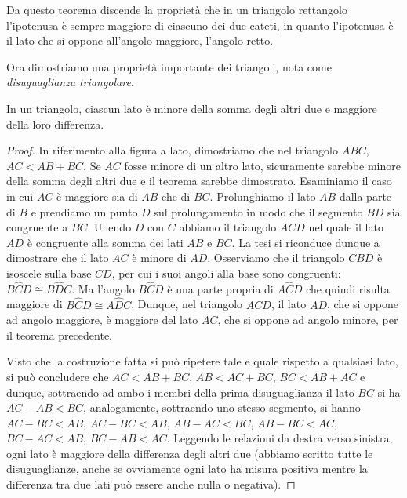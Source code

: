 Da questo teorema discende la proprietà che in un triangolo 
rettangolo l'ipotenusa è sempre maggiore di ciascuno dei due cateti, 
in quanto l'ipotenusa è il lato che si oppone all'angolo maggiore, 
l'angolo retto.

Ora dimostriamo una proprietà importante dei triangoli, nota come 
\emph{disuguaglianza triangolare}.

\begin{teorema}
In un triangolo, ciascun lato è minore della somma degli altri due e 
maggiore della loro differenza.
\end{teorema}

\noindent\begin{minipage}{0.7\textwidth}\parindent15pt 
\begin{proof}
In riferimento alla figura a lato, dimostriamo che nel triangolo 
\(ABC\), \(AC < AB + BC\). Se \(AC\) fosse minore di un altro lato, 
sicuramente sarebbe minore della somma degli altri due e il teorema 
sarebbe dimostrato. Esaminiamo il caso in cui \(AC\) è maggiore sia di 
\(AB\) che di \(BC\). Prolunghiamo il lato \(AB\) dalla parte di \(B\) e 
prendiamo un punto \(D\) sul prolungamento in modo che il segmento \(BD\) 
sia congruente a \(BC\). Unendo \(D\) con \(C\) abbiamo il triangolo \(ACD\) 
nel quale il lato \(AD\) è congruente alla somma dei lati \(AB\) e \(BC\). 
La tesi si riconduce dunque a dimostrare che il lato \(AC\) è minore di 
\(AD\). Osserviamo che il triangolo \(CBD\) è isoscele sulla base \(CD\), 
per cui i suoi angoli alla base sono congruenti: \(B\widehat{C}D\cong 
B\widehat{D}C\). Ma l'angolo \(B\widehat{C}D\) è una parte propria di 
\(A\widehat{C}D\) che quindi risulta maggiore di \(B\widehat{C}D\cong 
A\widehat{D}C\). Dunque, nel triangolo \(ACD\), il lato \(AD\), che si 
oppone ad angolo maggiore, è maggiore del lato \(AC\), che si oppone ad 
angolo minore, per il teorema precedente.
 
Visto che la costruzione fatta si può ripetere tale e quale rispetto 
a qualsiasi lato, si può concludere che \(AC<AB+BC\), \(AB<AC+BC\), 
\(BC<AB+AC\) e dunque, sottraendo ad ambo i membri della prima 
disuguaglianza il lato \(BC\) si ha \(AC-AB<BC\), analogamente, 
sottraendo uno stesso segmento, si hanno \(AC-BC<AB\), \(AC-BC<AB\), 
\(AB-AC<BC\), \(AB-BC<AC\), \(BC-AC<AB\), \(BC-AB<AC\). Leggendo le relazioni 
da destra verso sinistra, ogni lato è maggiore della differenza degli 
altri due (abbiamo scritto tutte le disuguaglianze, anche se 
ovviamente ogni lato ha misura positiva mentre la differenza tra due 
lati può essere anche nulla o negativa).
\end{proof}
\end{minipage}\hfil
\begin{minipage}{0.3\textwidth}
\centering
\end{minipage}

